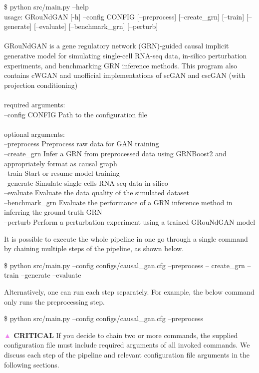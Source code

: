 \begin{tcolorbox}
\begin{tcolorbox}[
    colback=gray!10,
    colframe=black,
    boxrule=0.3pt,
    arc=2pt,
    left=6pt, right=6pt,
    top=6pt, bottom=6pt,
    fontupper=\scriptsize\ttfamily,
    enhanced,
    breakable,
    listing only,
    listing options={
        basicstyle=\scriptsize\ttfamily,
        breaklines=true
    }
]
\$ python src/main.py --help\\
usage: GRouNdGAN [-h] --config CONFIG [--preprocess] [--create\_grn]
[--train] [--generate] [--evaluate] [--benchmark\_grn] [--perturb]\\
\\
GRouNdGAN is a gene regulatory network (GRN)-guided causal implicit
generative model for simulating single-cell RNA-seq data, in-silico perturbation experiments, and benchmarking GRN inference methods. This program also contains cWGAN and unofficial implementations of scGAN and cscGAN (with projection conditioning)\\
\\
required arguments:\\
--config CONFIG    Path to the configuration file\\
\\
optional arguments:\\
--preprocess       Preprocess raw data for GAN training\\
--create\_grn       Infer a GRN from preprocessed data using GRNBoost2 and appropriately format as causal graph\\
--train            Start or resume model training\\
--generate         Simulate single-cells RNA-seq data in-silico\\
--evaluate         Evaluate the data quality of the simulated dataset\\
--benchmark\_grn    Evaluate the performance of a GRN inference method in inferring the ground truth GRN\\
--perturb          Perform a perturbation experiment using a trained GRouNdGAN model
\end{tcolorbox}

It is possible to execute the whole pipeline in one go through a single command by chaining
multiple steps of the pipeline, as shown below. 
\begin{codeblock}
\$ python src/main.py --config configs/causal\_gan.cfg --preprocess --
create\_grn --train –generate --evaluate
\end{codeblock}
Alternatively, one can run each step separately. For example, the below command only runs the preprocessing step. 
\begin{codeblock}
\$ python src/main.py --config configs/causal\_gan.cfg --preprocess
\end{codeblock}
\textbf{\textcolor{violet}{▲} CRITICAL} If you decide to chain two or more commands, the supplied configuration file must
include required arguments of all invoked commands. We discuss each step of the pipeline and
relevant configuration file arguments in the following sections.


\end{tcolorbox}
